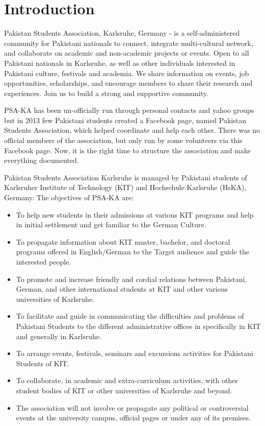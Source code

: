\chapter{Introduction}
Pakistan Students Association, Karlsruhe, Germany - is a self-administered community for Pakistani nationals to connect, integrate multi-cultural network, and collaborate on academic and non-academic projects or events. Open to all Pakistani nationals in Karlsruhe, as well as other individuals interested in Pakistani culture, festivals and academia. We share information on events, job opportunities, scholarships, and encourage members to share their research and experiences. Join us to build a strong and supportive community.

PSA-KA has been un-officially run through personal contacts and yahoo groups but in 2013 few Pakistani students created a Facebook page, named Pakistan Students Association, which helped coordinate and help each other. There was no official members of the association, but only run by some volunteers via this Facebook page. Now, it is the right time to structure the association and make everything documented.

Pakistan Students  Association Karlsruhe is managed by Pakistani students of Karlsruher Institute of Technology (KIT) and Hochschule Karlsruhe (HsKA), Germany. 
The objectives of PSA-KA are:
\begin{itemize}
	\item To help new students in their admissions at various KIT programs and help in initial settlement and get familiar to the German Culture.
	\item To propagate information about KIT master, bachelor, and doctoral programs offered in English/German to the Target audience and guide the interested people. 
	\item To promote and increase friendly and cordial relations between Pakistani, German, and other international students at KIT and other various universities of Karlsruhe.
	\item To facilitate and guide in communicating the difficulties and problems of Pakistani Students to the different administrative offices in specifically in KIT and generally in Karlsruhe.
	\item To arrange events, festivals, seminars and excursions activities for Pakistani Students of KIT.
	\item To collaborate, in academic and extra-curriculum activities,  with other student bodies of KIT or other universities of Karlsruhe and beyond.
	\item The association will not involve or propagate  any political or controversial events at the university campus, official pages or under any of its premises.
\end{itemize}

